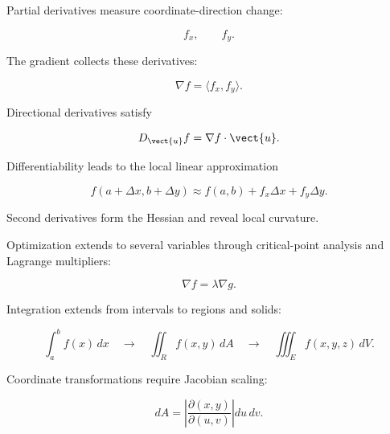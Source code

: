 Partial derivatives measure coordinate-direction change:

\[ f_x,\qquad f_y. \]

The gradient collects these derivatives:

\[ \nabla f=\langle f_x,f_y\rangle. \]

Directional derivatives satisfy

\[ D_{\vect{u}}f=\nabla f\cdot\vect{u}. \]

Differentiability leads to the local linear approximation

\[ f(a+\Delta x,b+\Delta y)
\approx
f(a,b)+f_x\Delta x+f_y\Delta y. \]

Second derivatives form the Hessian and reveal local curvature.

Optimization extends to several variables through critical-point analysis and
Lagrange multipliers:

\[ \nabla f=\lambda\nabla g. \]

Integration extends from intervals to regions and solids:

\[ \int_a^b f(x)\,dx
\quad\longrightarrow\quad
\iint_R f(x,y)\,dA
\quad\longrightarrow\quad
\iiint_E f(x,y,z)\,dV. \]

Coordinate transformations require Jacobian scaling:

\[ dA=
\left|
\frac{\partial(x,y)}{\partial(u,v)}
\right|du\,dv. \]

\begin{center}
\end{center}

